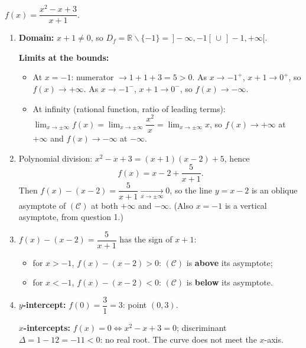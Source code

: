 \documentclass[11pt]{article}
\newcommand{\cle}[1]{{\popxbold\color{popdark}#1}}
\def\setminus{\mathbin{\backslash}}\let\smallsetminus\setminus
\begin{document}
\begin{corrige}
$f(x)=\dfrac{x^{2}-x+3}{x+1}$.

\begin{enumerate}
\item \textbf{Domain:} $x+1\neq 0$, so $D_f=\mathbb{R}\setminus\{-1\}=\,]-\infty,-1[\,\cup\,]-1,+\infty[$.

\textbf{Limits at the bounds:}
\begin{itemize}
\item At $x=-1$: numerator $\to 1+1+3=5>0$. As $x\to -1^{+}$, $x+1\to 0^{+}$, so $f(x)\to +\infty$. As $x\to -1^{-}$, $x+1\to 0^{-}$, so $f(x)\to -\infty$.
\item At infinity (rational function, ratio of leading terms): $\lim_{x\to\pm\infty}f(x)=\lim_{x\to\pm\infty}\dfrac{x^{2}}{x}=\lim_{x\to\pm\infty}x$, so $f(x)\to +\infty$ at $+\infty$ and $f(x)\to -\infty$ at $-\infty$.
\end{itemize}

\item Polynomial division: $x^{2}-x+3=(x+1)(x-2)+5$, hence
\[ f(x)=x-2+\frac{5}{x+1}. \]
Then $f(x)-(x-2)=\dfrac{5}{x+1}\xrightarrow[x\to\pm\infty]{}0$, so the line $y=x-2$ is an \cle{oblique asymptote} of $(\mathcal{C})$ at both $+\infty$ and $-\infty$. (Also $x=-1$ is a vertical asymptote, from question 1.)

\item $f(x)-(x-2)=\dfrac{5}{x+1}$ has the sign of $x+1$:
\begin{itemize}
\item for $x>-1$, $f(x)-(x-2)>0$: $(\mathcal{C})$ is \textbf{above} its asymptote;
\item for $x<-1$, $f(x)-(x-2)<0$: $(\mathcal{C})$ is \textbf{below} its asymptote.
\end{itemize}

\item \textbf{$y$-intercept:} $f(0)=\dfrac{3}{1}=3$: point $(0,3)$.

\textbf{$x$-intercepts:} $f(x)=0 \iff x^{2}-x+3=0$; discriminant $\Delta=1-12=-11<0$: no real root. The curve does not meet the $x$-axis.
\end{enumerate}
\end{corrige}
\end{document}
